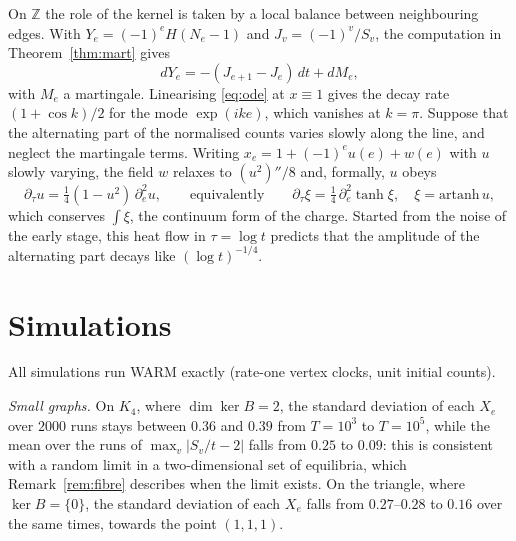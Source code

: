 \documentclass[11pt]{amsart}
\theoremstyle{remark}\newtheorem{remark}[theorem]{Remark}
\begin{document}
On $\mathbb{Z}$ the role of the kernel is taken by a local balance between neighbouring edges. With $Y_e=(-1)^eH(N_e-1)$ and $J_v=(-1)^v/S_v$,
the computation in Theorem~\ref{thm:mart} gives
\[ dY_e=-(J_{e+1}-J_e)\,dt+dM_e , \]
with $M_e$ a martingale. Linearising \eqref{eq:ode} at $x\equiv1$ gives the decay rate $(1+\cos k)/2$ for the mode
$\exp(ike)$, which vanishes at $k=\pi$. Suppose that the alternating part of
the normalised counts varies slowly along the line, and neglect the martingale terms. Writing $x_e=1+(-1)^eu(e)+w(e)$ with $u$ slowly varying, the field $w$ relaxes to
$(u^2)''/8$ and, formally, $u$ obeys
\[ \partial_\tau u=\tfrac14(1-u^2)\,\partial_e^2u ,\qquad\text{equivalently}\qquad \partial_\tau \xi=\tfrac14\,\partial_e^2\tanh \xi,\quad \xi=\mathrm{artanh}\,u, \]
which conserves $\int \xi$, the continuum form of the charge. Started from the noise of the early stage, this heat flow
in $\tau=\log t$ predicts that the amplitude of the alternating part decays like $(\log t)^{-1/4}$.

\section{Simulations}\label{sec:num}
All simulations run WARM exactly (rate-one vertex clocks, unit initial counts).

\emph{Small graphs.} On $K_4$, where $\dim\ker B=2$, the standard deviation of each $X_e$ over $2000$ runs
stays between $0.36$ and $0.39$ from $T=10^3$ to $T=10^5$, while the mean over the runs of
$\max_v|S_v/t-2|$ falls from $0.25$ to $0.09$: this is consistent with a random limit in a two-dimensional set of
equilibria, which Remark~\ref{rem:fibre} describes when the limit exists. On the triangle, where $\ker B=\{0\}$, the
standard deviation of each $X_e$ falls from $0.27$--$0.28$ to $0.16$ over the same times, towards the point $(1,1,1)$.
\end{document}
